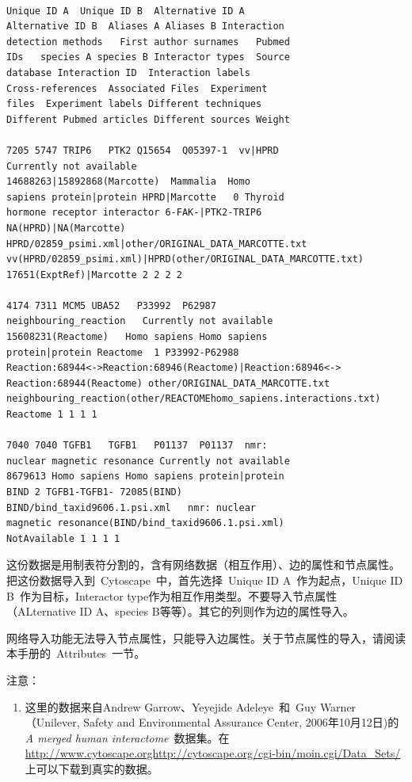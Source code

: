 \begin{verbatim}

Unique ID A  Unique ID B  Alternative ID A
Alternative ID B  Aliases A Aliases B Interaction
detection methods   First author surnames   Pubmed
IDs   species A species B Interactor types  Source
database Interaction ID  Interaction labels
Cross-references  Associated Files  Experiment
files  Experiment labels Different techniques
Different Pubmed articles Different sources Weight

7205 5747 TRIP6   PTK2 Q15654  Q05397-1  vv|HPRD
Currently not available
14688263|15892868(Marcotte)  Mammalia  Homo
sapiens protein|protein HPRD|Marcotte   0 Thyroid
hormone receptor interactor 6-FAK-|PTK2-TRIP6
NA(HPRD)|NA(Marcotte)
HPRD/02859_psimi.xml|other/ORIGINAL_DATA_MARCOTTE.txt
vv(HPRD/02859_psimi.xml)|HPRD(other/ORIGINAL_DATA_MARCOTTE.txt)
17651(ExptRef)|Marcotte 2 2 2 2

4174 7311 MCM5 UBA52   P33992  P62987
neighbouring_reaction   Currently not available
15608231(Reactome)   Homo sapiens Homo sapiens
protein|protein Reactome  1 P33992-P62988
Reaction:68944<->Reaction:68946(Reactome)|Reaction:68946<->
Reaction:68944(Reactome) other/ORIGINAL_DATA_MARCOTTE.txt
neighbouring_reaction(other/REACTOMEhomo_sapiens.interactions.txt)
Reactome 1 1 1 1

7040 7040 TGFB1   TGFB1   P01137  P01137  nmr:
nuclear magnetic resonance Currently not available
8679613 Homo sapiens Homo sapiens protein|protein
BIND 2 TGFB1-TGFB1- 72085(BIND)
BIND/bind_taxid9606.1.psi.xml   nmr: nuclear
magnetic resonance(BIND/bind_taxid9606.1.psi.xml)
NotAvailable 1 1 1 1

\end{verbatim}

这份数据是用制表符分割的，含有网络数据（相互作用）、边的属性和节点属性。把这份数据导入到~Cytoscape~中，首先选择~Unique ID A~作为起点，Unique ID B~作为目标，Interactor type作为相互作用类型。不要导入节点属性（ALternative ID A、species B等等）。其它的列则作为边的属性导入。

网络导入功能无法导入节点属性，只能导入边属性。关于节点属性的导入，请阅读本手册的~Attributes~一节。


注意：
\begin{enumerate}
	\item 这里的数据来自Andrew Garrow、Yeyejide Adeleye~和~Guy Warner（Unilever, Safety and Environmental Assurance Center, 2006年10月12日)的\emph{A merged human interactome}~数据集。在\url{http://www.cytoscape.orghttp://cytoscape.org/cgi-bin/moin.cgi/Data\_Sets/}上可以下载到真实的数据。
\end{enumerate}

